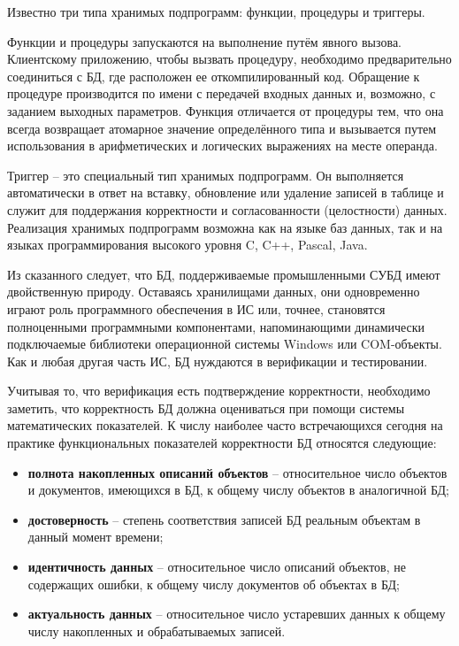 Известно три типа хранимых подпрограмм: функции, процедуры и триггеры.

Функции и процедуры запускаются на выполнение путём явного вызова. Клиентскому приложению, чтобы вызвать процедуру,
необходимо предварительно соединиться с БД, где расположен ее откомпилированный код. Обращение к процедуре
производится по имени с передачей входных данных и, возможно, с заданием выходных параметров. Функция отличается
от процедуры тем, что она всегда возвращает атомарное значение определённого типа и вызывается путем использования
в арифметических и логических выражениях на месте операнда.

Триггер – это специальный тип хранимых подпрограмм. Он выполняется автоматически в ответ на вставку, обновление
или удаление записей в таблице и служит для поддержания корректности и согласованности (целостности) данных.
Реализация хранимых подпрограмм возможна как на языке баз данных, так и на языках программирования высокого уровня
C, C++, Pascal, Java.

Из сказанного следует, что БД, поддерживаемые промышленными СУБД имеют двойственную природу. Оставаясь хранилищами
данных, они одновременно играют роль программного обеспечения в ИС или, точнее, становятся полноценными программными
компонентами, напоминающими динамически подключаемые библиотеки операционной системы Windows или COM-объекты.
Как и любая другая часть ИС, БД нуждаются в верификации и тестировании.

Учитывая то, что верификация есть подтверждение корректности, необходимо заметить, что корректность БД
должна оцениваться при помощи системы математических показателей. К числу наиболее часто встречающихся сегодня на
практике функциональных показателей корректности БД относятся следующие:
\begin{itemize}
    \item \textbf{полнота накопленных описаний объектов} – относительное число объектов и документов, имеющихся
    в БД, к общему числу объектов в аналогичной БД;

    \item \textbf{достоверность} – степень соответствия записей БД реальным объектам в данный момент времени;

    \item \textbf{идентичность данных} – относительное число описаний объектов, не содержащих ошибки,
    к общему числу документов об объектах в БД;

    \item \textbf{актуальность данных} – относительное число устаревших данных к общему числу накопленных
    и обрабатываемых записей.
\end{itemize}

